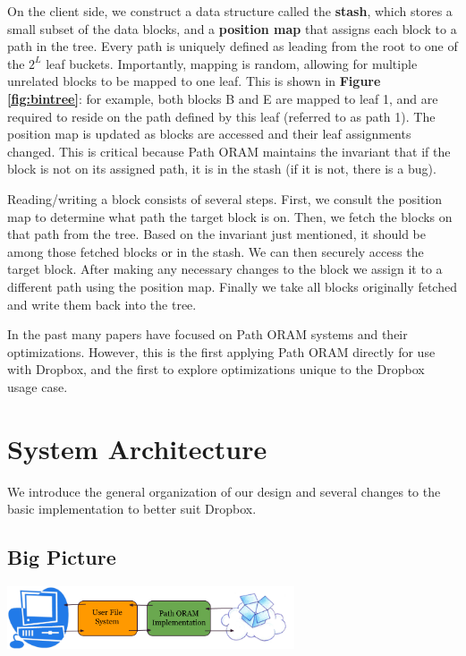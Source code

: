 \documentclass[conference]{IEEEtran}
\begin{document}
On the client side, we construct a data structure called the {\bf stash}, which stores a small subset of the data blocks, and a {\bf position map} that assigns each block to a path in the tree. Every path is uniquely defined as leading from the root to one of the $2^L$ leaf buckets. Importantly, mapping is random, allowing for multiple unrelated blocks to be mapped to one leaf. This is shown in {\bf Figure \ref{fig:bintree}}: for example, both blocks B and E are mapped to leaf 1, and are required to reside on the path defined by this leaf (referred to as path 1). The position map is updated as blocks are accessed and their leaf assignments changed. This is critical because Path ORAM maintains the invariant that if the block is not on its assigned path, it is in the stash (if it is not, there is a bug).

Reading/writing a block consists of several steps. First, we consult the position map to determine what path the target block is on. Then, we fetch the blocks on that path from the tree. Based on the invariant just mentioned, it should be among those fetched blocks or in the stash. We can then securely access the target block. After making any necessary changes to the block we assign it to a different path using the position map. Finally we take all blocks originally fetched and write them back into the tree.

In the past many papers have focused on Path ORAM systems and their optimizations. However, this is the first applying Path ORAM directly for use with Dropbox, and the first to explore optimizations unique to the Dropbox usage case.



\section{System Architecture}

We introduce the general organization of our design and several changes to the basic implementation to better suit Dropbox.

\subsection{Big Picture}

\begin{center}
\noindent\includegraphics[width=8.5cm]{310.png}
\end{center}
\end{document}
